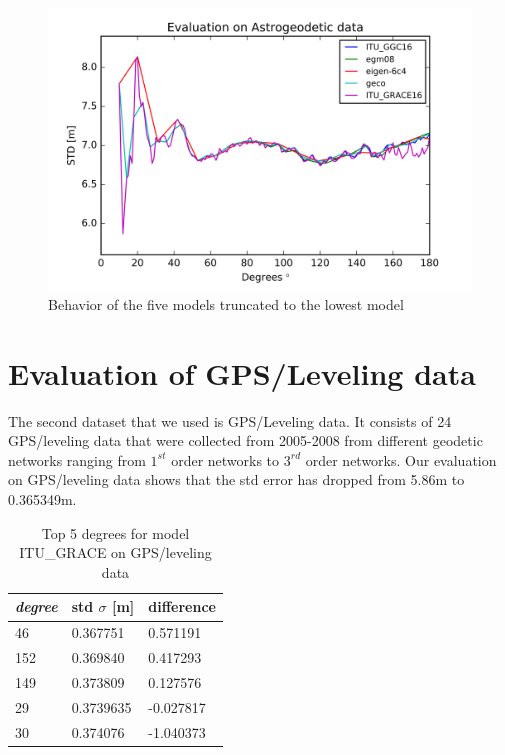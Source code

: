       
        \begin{figure}[t]
           	\caption{Behavior of the five models truncated to the lowest model}
           	\label{eigen_6c4_figure}
           	\includegraphics{Figures/grayscale_style.png}
           	\centering
        \end{figure}
        
        \section{Evaluation of GPS/Leveling data}
        The second dataset that we used is GPS/Leveling data. It consists of 24 GPS/leveling data that were collected from 2005-2008 from different geodetic networks ranging from $1^{st}$ order networks to $3^{rd}$ order networks. Our evaluation on GPS/leveling data shows that the std error has dropped from 5.86m to 0.365349m. 
        
          \begin{table}[]
          	\centering
          	\caption{Top 5 degrees for model ITU\_GRACE on GPS/leveling data}
          	\label{table:ggm_models}
          	\begin{tabular}{@{}lll@{}}
          		\toprule
          		\emph{degree} & std $\sigma$ [m]  & difference\\ \midrule
          		46 &0.367751&    0.571191\\
          		152 &0.369840&   0.417293\\
          		149 &0.373809 &  0.127576\\
          		29 &0.3739635 &  -0.027817\\
          		30 &0.374076  & -1.040373\\
          		\bottomrule
          		
          	\end{tabular}
          \end{table}
          
